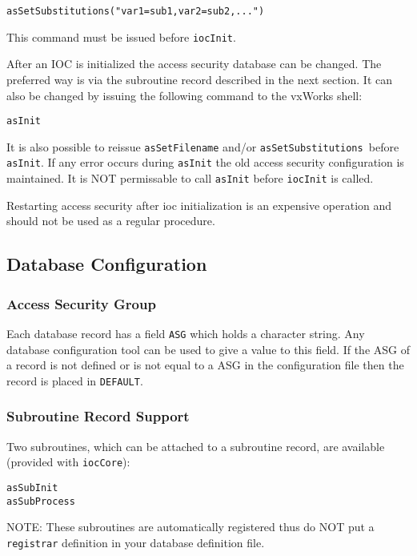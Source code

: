 \begin{verbatim}asSetSubstitutions("var1=sub1,var2=sub2,...")
\end{verbatim}This command must be issued before \verb|iocInit|.

After an IOC is initialized the access security database can be changed. The preferred way is via the subroutine record 
described in the next section. It can also be changed by issuing the following command to the vxWorks shell:

\begin{verbatim}asInit
\end{verbatim}It is also possible to reissue \verb|asSetFilename| and/or \verb|asSetSubstitutions |before \verb|asInit|. If any error occurs 
during \verb|asInit| the old access security configuration is maintained. It is NOT permissable to call \verb|asInit| before 
\verb|iocInit| is called. 

Restarting access security after ioc initialization is an expensive operation and should not be used as a regular procedure.

\subsection{Database Configuration}



\subsubsection{Access Security Group}

Each database record has a field \verb|ASG| which holds a character string. Any database configuration tool can be used to give 
a value to this field. If the ASG of a record is not defined or is not equal to a ASG in the configuration file then the record 
is placed in \verb|DEFAULT|. 

\subsubsection{Subroutine Record Support}

Two subroutines, which can be attached to a subroutine record, are available (provided with \verb|iocCore|):

\begin{verbatim}asSubInit
asSubProcess
\end{verbatim}
NOTE: These subroutines are automatically registered thus do NOT put a \verb|registrar| definition in your database 
definition file.

